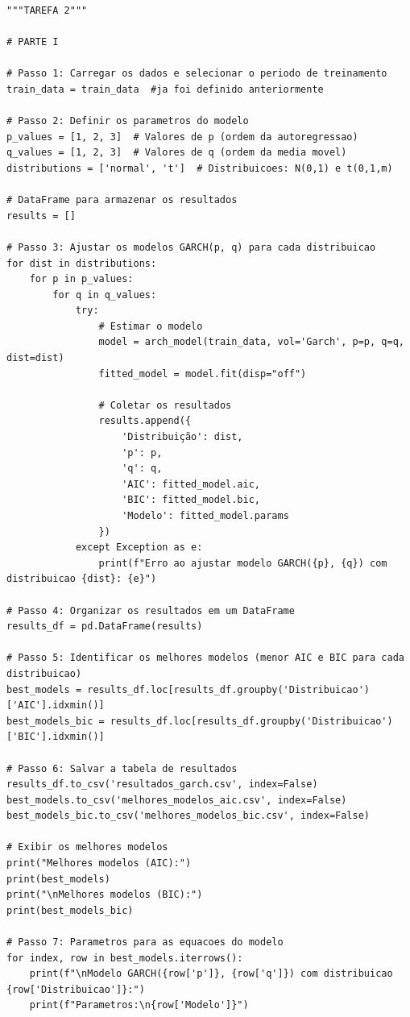 \documentclass[a4paper, 12pt]{article}
\begin{document}
\begin{lstlisting}[style=python]
"""TAREFA 2"""

# PARTE I

# Passo 1: Carregar os dados e selecionar o periodo de treinamento
train_data = train_data  #ja foi definido anteriormente

# Passo 2: Definir os parametros do modelo
p_values = [1, 2, 3]  # Valores de p (ordem da autoregressao)
q_values = [1, 2, 3]  # Valores de q (ordem da media movel)
distributions = ['normal', 't']  # Distribuicoes: N(0,1) e t(0,1,m)

# DataFrame para armazenar os resultados
results = []

# Passo 3: Ajustar os modelos GARCH(p, q) para cada distribuicao
for dist in distributions:
    for p in p_values:
        for q in q_values:
            try:
                # Estimar o modelo
                model = arch_model(train_data, vol='Garch', p=p, q=q, dist=dist)
                fitted_model = model.fit(disp="off")

                # Coletar os resultados
                results.append({
                    'Distribuição': dist,
                    'p': p,
                    'q': q,
                    'AIC': fitted_model.aic,
                    'BIC': fitted_model.bic,
                    'Modelo': fitted_model.params
                })
            except Exception as e:
                print(f"Erro ao ajustar modelo GARCH({p}, {q}) com distribuicao {dist}: {e}")

# Passo 4: Organizar os resultados em um DataFrame
results_df = pd.DataFrame(results)

# Passo 5: Identificar os melhores modelos (menor AIC e BIC para cada distribuicao)
best_models = results_df.loc[results_df.groupby('Distribuicao')['AIC'].idxmin()]
best_models_bic = results_df.loc[results_df.groupby('Distribuicao')['BIC'].idxmin()]

# Passo 6: Salvar a tabela de resultados
results_df.to_csv('resultados_garch.csv', index=False)
best_models.to_csv('melhores_modelos_aic.csv', index=False)
best_models_bic.to_csv('melhores_modelos_bic.csv', index=False)

# Exibir os melhores modelos
print("Melhores modelos (AIC):")
print(best_models)
print("\nMelhores modelos (BIC):")
print(best_models_bic)

# Passo 7: Parametros para as equacoes do modelo
for index, row in best_models.iterrows():
    print(f"\nModelo GARCH({row['p']}, {row['q']}) com distribuicao {row['Distribuicao']}:")
    print(f"Parametros:\n{row['Modelo']}")

\end{lstlisting}
\end{document}
